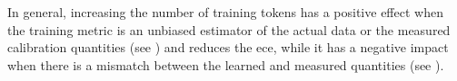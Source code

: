 In general, increasing the number of training tokens has a positive effect when the training metric is an unbiased estimator of the actual data or the measured calibration quantities (see ) and reduces the \gls{ece}, while it has a negative impact when there is a mismatch between the learned and measured quantities (see ).
